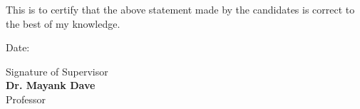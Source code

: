 \documentclass[12pt,oneside,a4paper]{report}
\begin{document}
\vspace{1cm}

\noindent This is to certify that the above statement made by the candidates is correct to the best of my knowledge.

\vspace{1.5cm}

\noindent Date: \underline{\hspace{3cm}}

\vspace{1cm}

\begin{flushright}
\parbox{6cm}{
    Signature of Supervisor\\[0.5cm]
    \textbf{Dr. Mayank Dave}\\
    Professor
}
\end{flushright}
\end{document}
